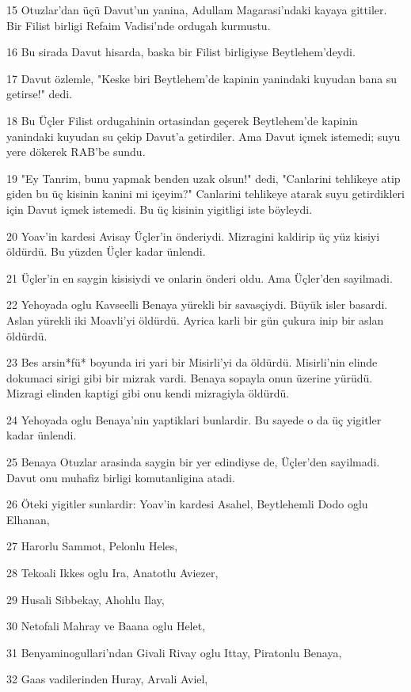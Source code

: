 \par 15 Otuzlar'dan üçü Davut'un yanina, Adullam Magarasi'ndaki kayaya gittiler. Bir Filist birligi Refaim Vadisi'nde ordugah kurmustu.
\par 16 Bu sirada Davut hisarda, baska bir Filist birligiyse Beytlehem'deydi.
\par 17 Davut özlemle, "Keske biri Beytlehem'de kapinin yanindaki kuyudan bana su getirse!" dedi.
\par 18 Bu Üçler Filist ordugahinin ortasindan geçerek Beytlehem'de kapinin yanindaki kuyudan su çekip Davut'a getirdiler. Ama Davut içmek istemedi; suyu yere dökerek RAB'be sundu.
\par 19 "Ey Tanrim, bunu yapmak benden uzak olsun!" dedi, "Canlarini tehlikeye atip giden bu üç kisinin kanini mi içeyim?" Canlarini tehlikeye atarak suyu getirdikleri için Davut içmek istemedi. Bu üç kisinin yigitligi iste böyleydi.
\par 20 Yoav'in kardesi Avisay Üçler'in önderiydi. Mizragini kaldirip üç yüz kisiyi öldürdü. Bu yüzden Üçler kadar ünlendi.
\par 21 Üçler'in en saygin kisisiydi ve onlarin önderi oldu. Ama Üçler'den sayilmadi.
\par 22 Yehoyada oglu Kavseelli Benaya yürekli bir savasçiydi. Büyük isler basardi. Aslan yürekli iki Moavli'yi öldürdü. Ayrica karli bir gün çukura inip bir aslan öldürdü.
\par 23 Bes arsin*fü* boyunda iri yari bir Misirli'yi da öldürdü. Misirli'nin elinde dokumaci sirigi gibi bir mizrak vardi. Benaya sopayla onun üzerine yürüdü. Mizragi elinden kaptigi gibi onu kendi mizragiyla öldürdü.
\par 24 Yehoyada oglu Benaya'nin yaptiklari bunlardir. Bu sayede o da üç yigitler kadar ünlendi.
\par 25 Benaya Otuzlar arasinda saygin bir yer edindiyse de, Üçler'den sayilmadi. Davut onu muhafiz birligi komutanligina atadi.
\par 26 Öteki yigitler sunlardir: Yoav'in kardesi Asahel, Beytlehemli Dodo oglu Elhanan,
\par 27 Harorlu Sammot, Pelonlu Heles,
\par 28 Tekoali Ikkes oglu Ira, Anatotlu Aviezer,
\par 29 Husali Sibbekay, Ahohlu Ilay,
\par 30 Netofali Mahray ve Baana oglu Helet,
\par 31 Benyaminogullari'ndan Givali Rivay oglu Ittay, Piratonlu Benaya,
\par 32 Gaas vadilerinden Huray, Arvali Aviel,
